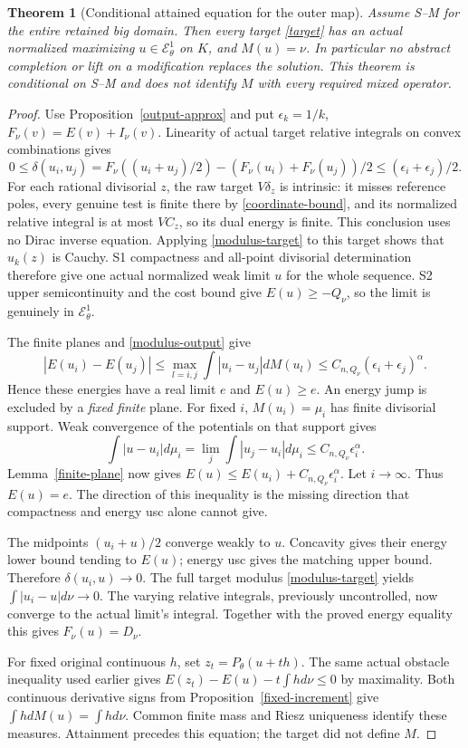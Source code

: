 \documentclass[10pt]{article}
\newtheorem{theorem}{Theorem}[section]
\newcommand{\E}{\mathcal E}
\begin{document}
\begin{theorem}[Conditional attained equation for the outer map]\label{attainment}
Assume S--M for the entire retained big domain. Then every target
\eqref{target} has an actual normalized maximizing $u\in\E^1_\theta$
on $K$, and $M(u)=\nu$. In particular no abstract completion or lift
on a modification replaces the solution. This theorem is conditional
on S--M and does not identify $M$ with every required mixed operator.
\end{theorem}
\begin{proof}
Use Proposition~\ref{output-approx} and put $\epsilon_k=1/k$,
$F_\nu(v)=E(v)+I_\nu(v)$.
Linearity of actual target relative integrals on convex combinations gives
\begin{equation}\label{near-mid}
 0\leq\delta(u_i,u_j)
 =F_\nu((u_i+u_j)/2)-(F_\nu(u_i)+F_\nu(u_j))/2
 \leq(\epsilon_i+\epsilon_j)/2.
\end{equation}
For each rational divisorial $z$, the raw target $V\delta_z$ is
intrinsic: it misses reference poles, every genuine test is finite
there by \eqref{coordinate-bound}, and its normalized relative integral
is at most $VC_z$, so its dual energy is finite. This conclusion
uses no Dirac inverse equation. Applying \eqref{modulus-target}
to this target shows that $u_k(z)$ is Cauchy.
S1 compactness and all-point divisorial determination therefore give
one actual normalized weak limit $u$ for the whole sequence. S2
upper semicontinuity and the cost bound give $E(u)\geq-Q_\nu$,
so the limit is genuinely in $\E^1_\theta$.

The finite planes and \eqref{modulus-output} give
\[
 |E(u_i)-E(u_j)|\leq
 \max_{l=i,j}\int|u_i-u_j|dM(u_l)
 \leq C_{n,Q_\nu}(\epsilon_i+\epsilon_j)^\alpha.
\]
Hence these energies have a real limit $e$ and $E(u)\geq e$.
An energy jump is excluded by a \emph{fixed finite} plane.
For fixed $i$, $M(u_i)=\mu_i$ has finite divisorial support. Weak
convergence of the potentials on that support gives
\[
 \int|u-u_i|d\mu_i
   =\lim_j\int|u_j-u_i|d\mu_i
   \leq C_{n,Q_\nu}\epsilon_i^\alpha.
\]
Lemma~\ref{finite-plane} now gives
$E(u)\leq E(u_i)+C_{n,Q_\nu}\epsilon_i^\alpha$.
Let $i\to\infty$. Thus $E(u)=e$. The direction of this inequality
is the missing direction that compactness and energy usc alone cannot give.

The midpoints $(u_i+u)/2$ converge weakly to $u$. Concavity gives
their energy lower bound tending to $E(u)$; energy usc gives the matching
upper bound. Therefore $\delta(u_i,u)\to0$.
The full target modulus \eqref{modulus-target} yields
$\int|u_i-u|d\nu\to0$. The varying relative integrals, previously
uncontrolled, now converge to the actual limit's integral. Together
with the proved energy equality this gives $F_\nu(u)=D_\nu$.

For fixed original continuous $h$, set $z_t=P_\theta(u+th)$.
The same actual obstacle inequality used earlier gives
$E(z_t)-E(u)-t\int h d\nu\leq0$ by maximality.
Both continuous derivative signs from Proposition~\ref{fixed-increment}
give $\int h dM(u)=\int h d\nu$. Common finite mass and Riesz
uniqueness identify these measures. Attainment precedes this equation;
the target did not define $M$.
\end{proof}
\end{document}
